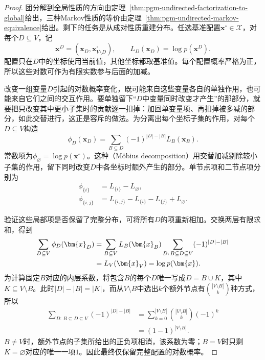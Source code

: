 \begin{proof}
团分解到全局性质的方向由定理~\ref{thm:pgm-undirected-factorization-to-global}给出，三种Markov性质的等价由定理~\ref{thm:pgm-undirected-markov-equivalence}给出。剩下的任务是从成对性质重建分布。任选基准配置$\bm{x}^{\circ}\in\mathcal{X}$，对每个$D\subseteq V$，记
\[
  \bm{x}^{D}=(\bm{x}_D,\bm{x}^{\circ}_{V\setminus D}),
  \qquad
  L_D(\bm{x}_D)=\log p(\bm{x}^{D}).
\]
配置只在$D$中的坐标使用当前值，其他坐标都取基准值。每个配置概率严格为正，所以这些对数可作为有限实数参与后面的加减。

改变一组变量$D$引起的对数概率变化，既可能来自这些变量各自的单独作用，也可能来自它们之间的交互作用。要单独留下“$D$中变量同时改变才产生”的那部分，就要把只改变其中更小子集时的贡献逐一扣掉：加回单变量项、再扣掉被多减的部分，如此交替进行，这正是容斥的做法。为分离出每个坐标子集的作用，对每个$D\subseteq V$构造
\begin{equation}
  \phi_D(\bm{x}_D)
  =\sum_{B\subseteq D}(-1)^{|D|-|B|}L_B(\bm{x}_B).
  \label{eq:pgm-undirected-mobius}
\end{equation}
常数项为$\phi_{\varnothing}=\log p(\bm{x}^{\circ})$。这种（Möbius decomposition）用交替加减剔除较小子集的作用，留下同时改变$D$中各坐标时额外产生的部分。单节点项和二节点项分别为
\[
  \begin{aligned}
    \phi_{\{i\}}&=L_{\{i\}}-L_{\varnothing},\\
    \phi_{\{i,j\}}
      &=L_{\{i,j\}}-L_{\{i\}}-L_{\{j\}}+L_{\varnothing}.
  \end{aligned}
\]

验证这些局部项是否保留了完整分布，可将所有$D$的项重新相加。交换两层有限求和，得到
\begin{align}
  \sum_{D\subseteq V}\phi_D(\bm{x}_D)
  &=\sum_{B\subseteq V}L_B(\bm{x}_B)
      \sum_{D:\,B\subseteq D\subseteq V}(-1)^{|D|-|B|}
      \notag\\
  &=L_V(\bm{x}_V)=\log p(\bm{x}).
  \label{eq:pgm-undirected-mobius-inversion}
\end{align}
为计算固定$B$对应的内层系数，将包含$B$的每个$D$唯一写成$D=B\cup K$，其中$K\subseteq V\setminus B$。此时$|D|-|B|=|K|$，而从$V\setminus B$中选出$k$个额外节点有$\binom{|V\setminus B|}{k}$种方式，所以
\[
  \begin{aligned}
    \sum_{D:\,B\subseteq D\subseteq V}(-1)^{|D|-|B|}
    &=\sum_{k=0}^{|V\setminus B|}
        \binom{|V\setminus B|}{k}(-1)^k\\
    &=(1-1)^{|V\setminus B|}.
  \end{aligned}
\]
$B\neq V$时，额外节点的子集所给出的正负项相消，该系数为零；$B=V$时只剩$K=\varnothing$对应的唯一一项$1$。因此最终仅保留完整配置的对数概率。


\end{proof}
